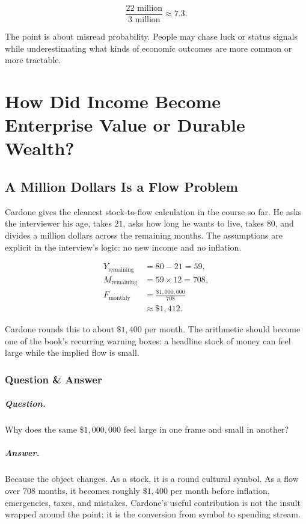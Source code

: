 \documentclass[11pt,oneside]{book}
\begin{document}
\begin{equation}
\frac{22\text{ million}}{3\text{ million}}
\approx 7.3.
\end{equation}

The point is about misread probability. People may chase luck or status signals while underestimating what kinds of economic outcomes are more common or more tractable.

\chapter{How Did Income Become Enterprise Value or Durable Wealth?}

\section{A Million Dollars Is a Flow Problem}

Cardone gives the cleanest stock-to-flow calculation in the course so far. He asks the interviewer his age, takes \(21\), asks how long he wants to live, takes \(80\), and divides a million dollars across the remaining months. The assumptions are explicit in the interview's logic: no new income and no inflation.

\begin{align}
Y_{\mathrm{remaining}} &=80-21=59,\\
M_{\mathrm{remaining}} &=59\times 12=708,\\
F_{\mathrm{monthly}}
&=
\frac{\$1{,}000{,}000}{708}\\
&\approx \$1{,}412.
\end{align}

Cardone rounds this to about \(\$1{,}400\) per month. The arithmetic should become one of the book's recurring warning boxes: a headline stock of money can feel large while the implied flow is small.

\subsection{Question \& Answer}

\paragraph{Question.}
Why does the same \(\$1{,}000{,}000\) feel large in one frame and small in another?

\paragraph{Answer.}
Because the object changes. As a stock, it is a round cultural symbol. As a flow over \(708\) months, it becomes roughly \(\$1{,}400\) per month before inflation, emergencies, taxes, and mistakes. Cardone's useful contribution is not the insult wrapped around the point; it is the conversion from symbol to spending stream.
\end{document}
